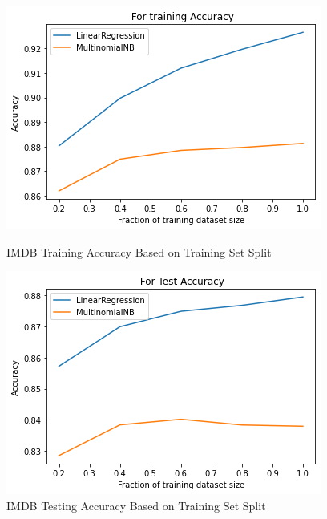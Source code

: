 \documentclass{homework}
\begin{document}
\begin{figure}[h!]
  \centering
  \begin{minipage}[h]{0.3\textwidth}
    \includegraphics[width=\textwidth]{imdb-varying-train-set-size-train-accuracy.png}
    \caption{IMDB Training Accuracy Based on Training Set Split}\label{imdb-training-split-train}
  \end{minipage}
\hspace{1.5cm}
   \begin{minipage}[h]{0.3\textwidth}
    \includegraphics[width=\textwidth]{imdb-varying-train-set-size-test-accuracy.png}
    \caption{IMDB Testing Accuracy Based on Training Set Split}\label{imdb-training-split-test}
  \end{minipage}
\end{figure}
\end{document}
